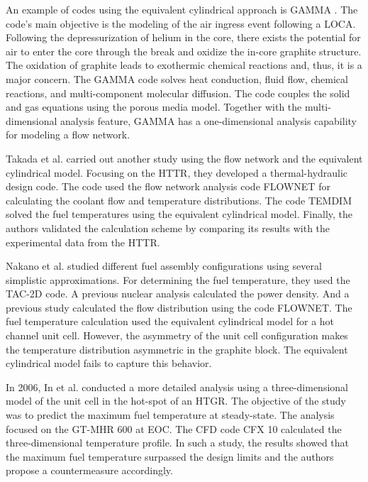 \documentclass[11pt,letterpaper]{article}
\begin{document}
An example of codes using the equivalent cylindrical approach is GAMMA \cite{no_multi-component_2007}.
The code’s main objective is the modeling of the air ingress event following a LOCA.
Following the depressurization of helium in the core, there exists the potential for air to enter the core through the break and oxidize the in-core graphite structure.
The oxidation of graphite leads to exothermic chemical reactions and, thus, it is a major concern.
The GAMMA code solves heat conduction, fluid flow, chemical reactions, and multi-component molecular diffusion.
The code couples the solid and gas equations using the porous media model.
Together with the multi-dimensional analysis feature, GAMMA has a one-dimensional analysis capability for  modeling a flow network.

Takada et al. \cite{takada_core_2004} carried out another study using the flow network and the equivalent cylindrical model.
Focusing on the \gls{HTTR}, they developed a thermal-hydraulic design code.
The code used the flow network analysis code FLOWNET \cite{maruyama_verification_1988} for calculating the coolant flow and temperature distributions.
The code TEMDIM \cite{maruyama_verification_1988} solved the fuel temperatures using the equivalent cylindrical model.
Finally, the authors validated the calculation scheme by comparing its results with the experimental data from the \gls{HTTR}.

Nakano et al. \cite{nakano_conceptual_2008} studied different fuel assembly configurations using several simplistic approximations.
For determining the fuel temperature, they used the TAC-2D code.
A previous nuclear analysis calculated the power density.
And a previous study calculated the flow distribution using the code FLOWNET.
The fuel temperature calculation used the equivalent cylindrical model for a hot channel unit cell.
However, the asymmetry of the unit cell configuration makes the temperature distribution asymmetric in the graphite block.
The equivalent cylindrical model fails to capture this behavior.

In 2006, In et al. \cite{in_three-dimensional_2006} conducted a more detailed analysis using a three-dimensional model of the unit cell in the hot-spot of an \gls{HTGR}.
The objective of the study was to predict the maximum fuel temperature at steady-state.
The analysis focused on the GT-MHR 600 at \gls{EOC}.
The CFD code CFX 10 \cite{ansys_inc_cfx_2006} calculated the three-dimensional temperature profile.
In such a study, the results showed that the maximum fuel temperature surpassed the design limits and the authors propose a countermeasure accordingly.
\end{document}
